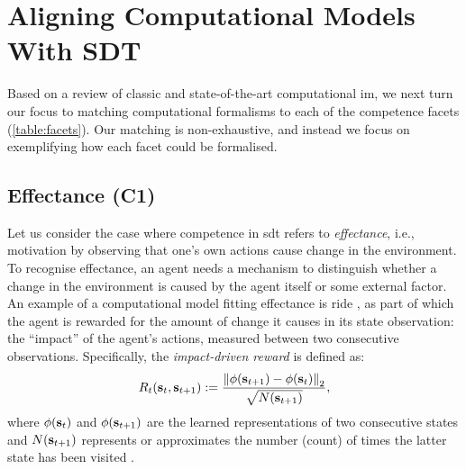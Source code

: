 \documentclass[10pt,letterpaper]{article}
\begin{document}
\section{Aligning Computational Models With SDT}
\label{sec:alignmodelswithsdt}

Based on a review of classic \citep{oudeyer2007what} and state-of-the-art \citep{colas2022autotelic,aubret2023information} computational \gls{im}, we next turn our focus to matching computational formalisms to each of the competence facets (\autoref{table:facets}). Our matching is non-exhaustive, and instead we focus on exemplifying how each facet could be formalised.



\subsection{Effectance (C1)}
\label{sec:effectance}

Let us consider the case where competence in \gls{sdt} refers to \emph{effectance}, i.e., motivation by observing that one's own actions cause change in the environment. To recognise effectance, an agent needs a mechanism to distinguish whether a change in the environment is caused by the agent itself or some external factor. An example of a computational model fitting effectance is \gls{ride} \citep{raileanu2020ride}, as part of which the agent is rewarded for the amount of change it causes in its state observation: the ``impact'' of the agent's actions, measured between two consecutive observations. Specifically, the \emph{impact-driven reward} is defined as:
\begin{align}\label{eq:ride}
R_t({\mathbf{s}}_t, {\mathbf{s}}_{t+1}) := \frac{\left\lVert\phi({\mathbf{s}}_{t+1})-\phi({\mathbf{s}}_t)\right\rVert_2}{\sqrt{N({\mathbf{s}}_{t+1})}},
\end{align}
where $\phi({\mathbf{s}}_t)$ and $\phi({\mathbf{s}}_{t+1})$ are the learned representations of two consecutive states and $N({\mathbf{s}}_{t+1})$ represents or approximates the number (count) of times the latter state has been visited \citep[pp.~4--5]{raileanu2020ride}.
\end{document}
